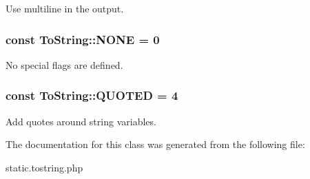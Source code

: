 Use multiline in the output. \hypertarget{class_to_string_af0b8a90e418aa81ea6d32e343ebf63f5}{
\subsubsection[{N\-O\-N\-E}]{\setlength{\rightskip}{0pt plus 5cm}const To\-String\-::\-N\-O\-N\-E = 0}}\label{class_to_string_af0b8a90e418aa81ea6d32e343ebf63f5}
No special flags are defined. \hypertarget{class_to_string_af5dec33b7dc8c795ad626944cfcd629f}{
\subsubsection[{Q\-U\-O\-T\-E\-D}]{\setlength{\rightskip}{0pt plus 5cm}const To\-String\-::\-Q\-U\-O\-T\-E\-D = 4}}\label{class_to_string_af5dec33b7dc8c795ad626944cfcd629f}
Add quotes around string variables. 

The documentation for this class was generated from the following file\-:\begin{DoxyCompactItemize}
\item 
static.\-tostring.\-php\end{DoxyCompactItemize}
